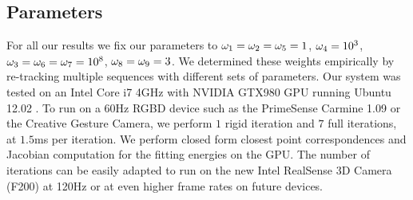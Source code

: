 \subsection*{Parameters} For all our results we fix our parameters to $\omega_1 = \omega_2 = \omega_5 = 1$, $\omega_4 = 10^3$, $\omega_3 = \omega_6 = \omega_7 = 10^8$, $\omega_8 = \omega_9 = 3$. We determined these weights empirically by re-tracking multiple sequences with different sets of parameters. 
Our system was tested on an Intel Core i7 4GHz with NVIDIA GTX980 GPU running Ubuntu 12.02 . To run on a 60Hz RGBD device such as the PrimeSense Carmine 1.09 or the Creative Gesture Camera, we perform $1$ rigid iteration and $7$ full iterations, at $1.5$ms per iteration. We perform closed form closest point correspondences and Jacobian computation for the fitting energies on the GPU. The number of iterations can be easily adapted to run on the new Intel RealSense 3D Camera (F200) at 120Hz or at even higher frame rates on future devices.




